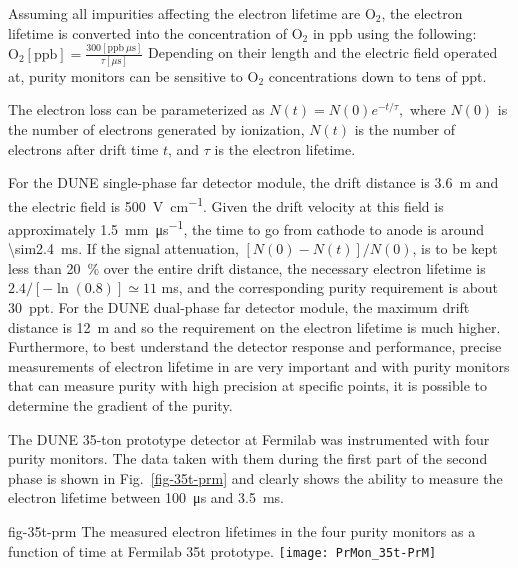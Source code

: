 Assuming all impurities affecting the electron lifetime are $\text{O}_2$, the electron lifetime is converted into the concentration of $\text{O}_2$ in \si{ppb} using the following:
%
\( \text{O}_2 [\text{ppb}] = \frac{300 [\text{ppb}~\mu \text{s}]}{\tau [\mu \text{s}]}\)
%
Depending on their length and the electric field operated at, purity monitors can be sensitive to $\text{O}_2$ concentrations down to tens of \si{ppt}. 

The electron loss can be parameterized as
%
\(N(t) = N(0)e^{-t/\tau},\)
%
where $N(0)$ is the number of electrons generated by ionization, $N(t)$ is the number of electrons after drift time $t$, and $\tau$ is the electron lifetime. 

For the DUNE single-phase far detector module, the drift distance is \SI{3.6}{\meter} and the electric field is \SI{500}{\volt\per\centi\meter}. Given the drift velocity at this field is approximately \SI{1.5}{\milli\meter\per\micro\second}, the time to go from cathode to anode is around \SI{\sim2.4}{\milli\second}\cite{Walkowiak:2000wf}.
If the   signal attenuation, \([N(0)-N(t)]/N(0)\), is to be kept less than \SI{20}{\percent} over the entire drift distance, the necessary electron lifetime is $2.4/[-\ln(0.8)] \simeq 11 $ ms, and the corresponding  purity requirement is about \SI{30}{ppt}. For the DUNE dual-phase far detector module, the maximum drift distance is \SI{12}{\meter} and so the requirement on the electron lifetime is much higher. Furthermore, to best understand the   detector response and performance, precise measurements of electron lifetime in  are very important and with purity monitors that can measure purity with high precision at specific points, it is possible to determine the gradient of the purity.

The DUNE 35-ton prototype detector at Fermilab was instrumented with four purity monitors. The data taken with them during the first part of the second phase is shown in Fig.~\ref{fig-35t-prm} and clearly shows the ability to measure the electron lifetime between \SI{100}{\micro\second} and \SI{3.5}{\milli\second}.  

\begin{dunefigure}{fig-35t-prm}
  {The measured electron lifetimes in the four purity monitors as a function of time at Fermilab 35\si{t} prototype.}
  \texttt{[image: PrMon\_35t-PrM]}%
\end{dunefigure}


